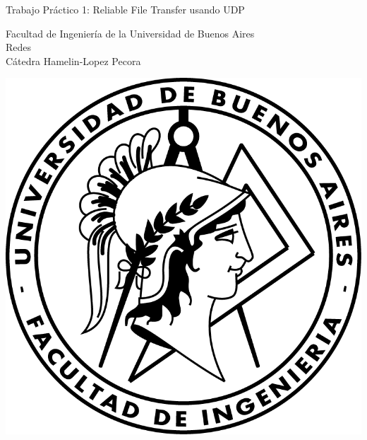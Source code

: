 \documentclass{article}
\begin{document}
\begin{titlepage}
  \vspace*{1cm}

  \begin{center}
    {\Huge{Trabajo Práctico 1: Reliable File Transfer usando UDP}}
  \end{center}

  \vspace{0.4cm}

  \begin{center}
    {\LARGE{Facultad de Ingeniería de la Universidad de Buenos Aires}}\\
    \vspace{0.3cm}
    {\Large{Redes}}\\
    \vspace{0.3cm}
    {\large{Cátedra Hamelin-Lopez Pecora}}\\
  \end{center}

  \vspace{0.8cm}
  \begin{center}
    \includegraphics[scale=0.8]{Logo-fiuba}
  \end{center}

  \vspace{1.4cm}
  \begin{center}


\end{center}
\end{titlepage}
\end{document}
